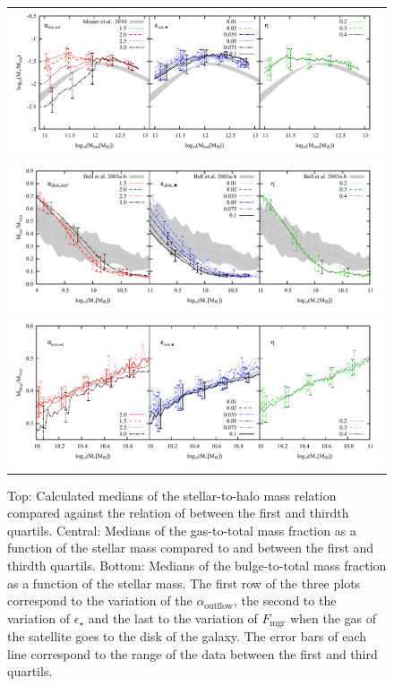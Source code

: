 \documentclass[usenatbib]{mn2e}
\begin{document}
\begin{figure}
\centering
\begin{tabular}{c}
\includegraphics{figures/runs/run-v1-13-multiplot-star-frac.pdf} \\
\includegraphics{figures/runs/run-v1-13-multiplot-gas-gfracscatter-quartils.pdf}\\
\includegraphics{figures/runs/run-v1-13-multiplot-bulge.pdf}
\end{tabular}
\caption{Top: Calculated medians of the stellar-to-halo mass relation
  compared against the relation of \citet{2010ApJ...710..903M} between
  the first and thirdth quartils. Central: Medians of the gas-to-total
  mass fraction as a  function of the stellar mass compared to
  \citet{2003ApJS..149..289B} and \citet{2003ApJ...585L.117B} between
  the first and thirdth quartils. Bottom: Medians of the
  bulge-to-total mass fraction as a function of the stellar mass. The
  first row of the three plots correspond to the variation of the
  $\alpha_{\text{outflow}}$, the second to the variation  of
  $\epsilon_{\star}$ and the last to the variation of $F_{\text{mgr}}$
  when the gas of the satellite goes to the disk of the galaxy. The
  error bars of each line correspond to the range of the data between
  the first and third quartils. \label{fig:properties-runs-compare}} 
\end{figure}
\end{document}
